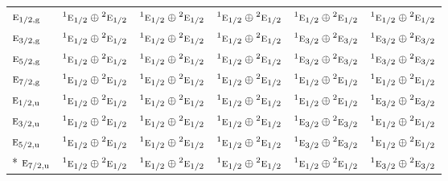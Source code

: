 \documentclass[10pt,a4paper]{article}
\numberwithin{equation}{section}
\newcommand{\irr}[1]{\text{\normalfont\scshape #1}}
\newcommand{\conjpair}[1]{{}^{#1}}
\newcommand{\ptag}[1]{\mathrm{#1}}
\begin{document}
{\begin{longtable}{@{}lccccc@{}}
$\irr{e}_{1/2,\ptag{g}}$ & $\conjpair{1}\irr{e}_{1/2}\oplus \conjpair{2}\irr{e}_{1/2}$ & $\conjpair{1}\irr{e}_{1/2}\oplus \conjpair{2}\irr{e}_{1/2}$ & $\conjpair{1}\irr{e}_{1/2}\oplus \conjpair{2}\irr{e}_{1/2}$ & $\conjpair{1}\irr{e}_{1/2}\oplus \conjpair{2}\irr{e}_{1/2}$ & $\conjpair{1}\irr{e}_{1/2}\oplus \conjpair{2}\irr{e}_{1/2}$\\
$\irr{e}_{3/2,\ptag{g}}$ & $\conjpair{1}\irr{e}_{1/2}\oplus \conjpair{2}\irr{e}_{1/2}$ & $\conjpair{1}\irr{e}_{1/2}\oplus \conjpair{2}\irr{e}_{1/2}$ & $\conjpair{1}\irr{e}_{1/2}\oplus \conjpair{2}\irr{e}_{1/2}$ & $\conjpair{1}\irr{e}_{3/2}\oplus \conjpair{2}\irr{e}_{3/2}$ & $\conjpair{1}\irr{e}_{3/2}\oplus \conjpair{2}\irr{e}_{3/2}$\\
$\irr{e}_{5/2,\ptag{g}}$ & $\conjpair{1}\irr{e}_{1/2}\oplus \conjpair{2}\irr{e}_{1/2}$ & $\conjpair{1}\irr{e}_{1/2}\oplus \conjpair{2}\irr{e}_{1/2}$ & $\conjpair{1}\irr{e}_{1/2}\oplus \conjpair{2}\irr{e}_{1/2}$ & $\conjpair{1}\irr{e}_{3/2}\oplus \conjpair{2}\irr{e}_{3/2}$ & $\conjpair{1}\irr{e}_{3/2}\oplus \conjpair{2}\irr{e}_{3/2}$\\
$\irr{e}_{7/2,\ptag{g}}$ & $\conjpair{1}\irr{e}_{1/2}\oplus \conjpair{2}\irr{e}_{1/2}$ & $\conjpair{1}\irr{e}_{1/2}\oplus \conjpair{2}\irr{e}_{1/2}$ & $\conjpair{1}\irr{e}_{1/2}\oplus \conjpair{2}\irr{e}_{1/2}$ & $\conjpair{1}\irr{e}_{1/2}\oplus \conjpair{2}\irr{e}_{1/2}$ & $\conjpair{1}\irr{e}_{1/2}\oplus \conjpair{2}\irr{e}_{1/2}$\\
$\irr{e}_{1/2,\ptag{u}}$ & $\conjpair{1}\irr{e}_{1/2}\oplus \conjpair{2}\irr{e}_{1/2}$ & $\conjpair{1}\irr{e}_{1/2}\oplus \conjpair{2}\irr{e}_{1/2}$ & $\conjpair{1}\irr{e}_{1/2}\oplus \conjpair{2}\irr{e}_{1/2}$ & $\conjpair{1}\irr{e}_{1/2}\oplus \conjpair{2}\irr{e}_{1/2}$ & $\conjpair{1}\irr{e}_{3/2}\oplus \conjpair{2}\irr{e}_{3/2}$\\
$\irr{e}_{3/2,\ptag{u}}$ & $\conjpair{1}\irr{e}_{1/2}\oplus \conjpair{2}\irr{e}_{1/2}$ & $\conjpair{1}\irr{e}_{1/2}\oplus \conjpair{2}\irr{e}_{1/2}$ & $\conjpair{1}\irr{e}_{1/2}\oplus \conjpair{2}\irr{e}_{1/2}$ & $\conjpair{1}\irr{e}_{3/2}\oplus \conjpair{2}\irr{e}_{3/2}$ & $\conjpair{1}\irr{e}_{1/2}\oplus \conjpair{2}\irr{e}_{1/2}$\\
$\irr{e}_{5/2,\ptag{u}}$ & $\conjpair{1}\irr{e}_{1/2}\oplus \conjpair{2}\irr{e}_{1/2}$ & $\conjpair{1}\irr{e}_{1/2}\oplus \conjpair{2}\irr{e}_{1/2}$ & $\conjpair{1}\irr{e}_{1/2}\oplus \conjpair{2}\irr{e}_{1/2}$ & $\conjpair{1}\irr{e}_{3/2}\oplus \conjpair{2}\irr{e}_{3/2}$ & $\conjpair{1}\irr{e}_{1/2}\oplus \conjpair{2}\irr{e}_{1/2}$\\*
$\irr{e}_{7/2,\ptag{u}}$ & $\conjpair{1}\irr{e}_{1/2}\oplus \conjpair{2}\irr{e}_{1/2}$ & $\conjpair{1}\irr{e}_{1/2}\oplus \conjpair{2}\irr{e}_{1/2}$ & $\conjpair{1}\irr{e}_{1/2}\oplus \conjpair{2}\irr{e}_{1/2}$ & $\conjpair{1}\irr{e}_{1/2}\oplus \conjpair{2}\irr{e}_{1/2}$ & $\conjpair{1}\irr{e}_{3/2}\oplus \conjpair{2}\irr{e}_{3/2}$\\
\bottomrule\end{longtable}}
\end{document}
